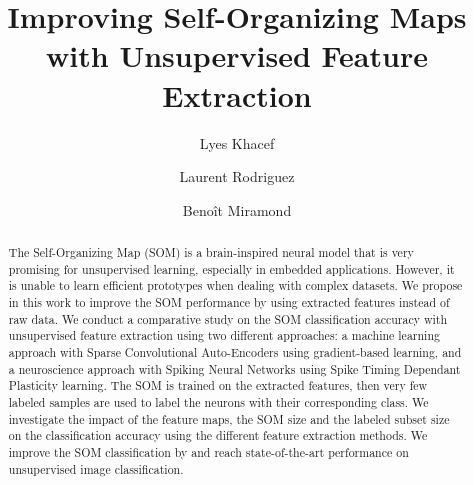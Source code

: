 \documentclass[runningheads]{llncs}
\begin{document}
\title{Improving Self-Organizing Maps with Unsupervised Feature Extraction}

\author{Lyes Khacef \and
Laurent Rodriguez \and
Beno\^it Miramond}



\maketitle

\begin{abstract}
The Self-Organizing Map (SOM) is a brain-inspired neural model that is very promising for unsupervised learning, especially in embedded applications. However, it is unable to learn efficient prototypes when dealing with complex datasets. We propose in this work to improve the SOM performance by using extracted features instead of raw data. We conduct a comparative study on the SOM classification accuracy with unsupervised feature extraction using two different approaches: a machine learning approach with Sparse Convolutional Auto-Encoders using gradient-based learning, and a neuroscience approach with Spiking Neural Networks using Spike Timing Dependant Plasticity learning. The SOM is trained on the extracted features, then very few labeled samples are used to label the neurons with their corresponding class. We investigate the impact of the feature maps, the SOM size and the labeled subset size on the classification accuracy using the different feature extraction methods. We improve the SOM classification by  and reach state-of-the-art performance on unsupervised image classification.


\end{abstract}
\end{document}
